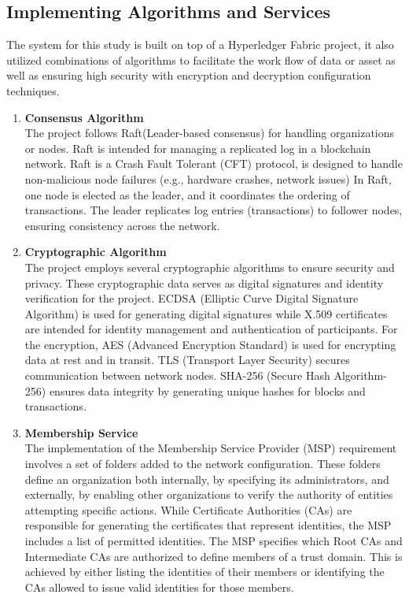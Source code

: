 \subsection{Implementing Algorithms and Services}
The system for this study is built on top of a Hyperledger Fabric project, it also utilized combinations of algorithms to facilitate the work flow of data or asset as well as ensuring high security with encryption and decryption configuration techniques. 
	\begin{enumerate}
		\item \textbf{Consensus Algorithm} \\The project follows Raft(Leader-based consensus) for handling organizations or nodes. Raft is intended for managing a replicated log in a blockchain network. Raft is a Crash Fault Tolerant (CFT) protocol, is designed to handle non-malicious node failures (e.g., hardware crashes, network issues) In Raft, one node is elected as the leader, and it coordinates the ordering of transactions. The leader replicates log entries (transactions) to follower nodes, ensuring consistency across the network. 
		
		\item \textbf{Cryptographic Algorithm} \\The project employs several cryptographic algorithms to ensure security and privacy. These cryptographic data serves as digital signatures and identity verification for the project. ECDSA (Elliptic Curve Digital Signature Algorithm) is used for generating digital signatures while X.509 certificates are intended for identity management and authentication of participants. For the encryption, AES (Advanced Encryption Standard) is used for encrypting data at rest and in transit. TLS (Transport Layer Security) secures communication between network nodes. SHA-256 (Secure Hash Algorithm-256) ensures data integrity by generating unique hashes for blocks and transactions.
		
		\item \textbf{Membership Service} \\The implementation of the Membership Service Provider (MSP) requirement involves a set of folders added to the network configuration. These folders define an organization both internally, by specifying its administrators, and externally, by enabling other organizations to verify the authority of entities attempting specific actions. While Certificate Authorities (CAs) are responsible for generating the certificates that represent identities, the MSP includes a list of permitted identities. The MSP specifies which Root CAs and Intermediate CAs are authorized to define members of a trust domain. This is achieved by either listing the identities of their members or identifying the CAs allowed to issue valid identities for those members.
		

\end{enumerate}
